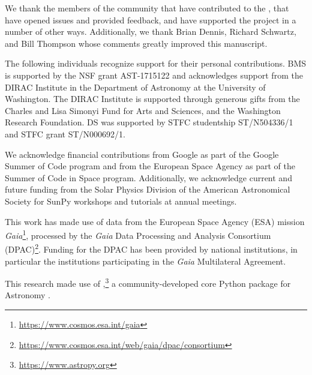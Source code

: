 \acknowledgments

We thank the members of the community that have contributed to the \sunpyproj, that have opened issues and provided feedback, and have supported the project in a number of other ways.
Additionally, we thank Brian Dennis, Richard Schwartz, and Bill Thompson whose comments greatly improved this manuscript.

The following individuals recognize support for their personal contributions.
BMS is supported by the NSF grant AST-1715122 and acknowledges support from the DIRAC Institute in the Department of Astronomy at the University of Washington.
The DIRAC Institute is supported through generous gifts from the Charles and Lisa Simonyi Fund for Arts and Sciences, and the Washington Research Foundation.
DS was supported by STFC studentship ST/N504336/1 and STFC grant ST/N000692/1.

We acknowledge financial contributions from Google as part of the Google Summer of Code program and from the European Space Agency as part of the Summer of Code in Space program.
Additionally, we acknowledge current and future funding from the Solar Physics Division of the American Astronomical Society for SunPy workshops and tutorials at annual meetings.

This work has made use of data from the European Space Agency (ESA) mission \textit{Gaia}\footnote{\url{https://www.cosmos.esa.int/gaia}}, processed by the \textit{Gaia} Data Processing and Analysis Consortium (DPAC)\footnote{\url{https://www.cosmos.esa.int/web/gaia/dpac/consortium}}.
Funding for the DPAC has been provided by national institutions, in particular the institutions participating in the {\it Gaia} Multilateral Agreement.

This research made use of \astropypkg,\footnote{\url{https://www.astropy.org}} a community-developed core Python package for Astronomy \citep{astropy2013, astropy2018}.

